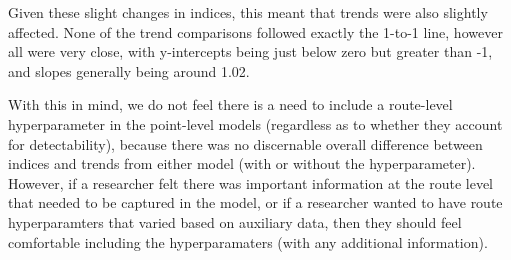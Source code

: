 Given these slight changes in indices, this meant that trends were also slightly affected. None of the trend comparisons followed exactly the 1-to-1 line, however all were very close, with y-intercepts being just below zero but greater than -1, and slopes generally being around 1.02.

With this in mind, we do not feel there is a need to include a route-level hyperparameter in the point-level models (regardless as to whether they account for detectability), because there was no discernable overall difference between indices and trends from either model (with or without the hyperparameter). However, if a researcher felt there was important information at the route level that needed to be captured in the model, or if a researcher wanted to have route hyperparamters that varied based on auxiliary data, then they should feel comfortable including the hyperparamaters (with any additional information).
